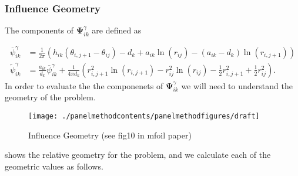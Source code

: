 \subsubsection{Influence Geometry}
\label{sssec:influencegeometry}

The components of \(\mathbf{\Psi}^\gamma_{ik}\) are defined as

\begin{align}
	\overline{\psi}^\gamma_{ik} &= \frac{1}{2\pi} \left( h_{ik} (\theta_{i,j+1} - \theta_{ij}) - d_k + a_{ik} \ln(r_{ij}) - (a_{ik}-d_k)\ln(r_{i,j+1}) \right) \\
	\widetilde{\psi}^\gamma_{ik} &=  \frac{a_{ik}}{d_k}\overline{\psi}^\gamma_{ik} + \frac{1}{4\pi d_k} \left(r^2_{i,j+1} \ln(r_{i,j+1}) - r^2_{ij} \ln(r_{ij}) - \frac{1}{2}r^2_{i,j+1} + \frac{1}{2}r^2_{ij} \right).
\end{align}
\noindent In order to evaluate the the componenets of \(\mathbf{\Psi}^\gamma_{ik}\) we will need to understand the geometry of the problem.

\begin{figure}[h]
	\centering
	\texttt{[image: ./panelmethodcontents/panelmethodfigures/draft]}
	\caption{Influence Geometry (see fig10 in mfoil paper)}
	\label{fig:influencegeometry}
\end{figure}

 shows the relative geometry for the problem, and we calculate each of the geometric values as follows.

